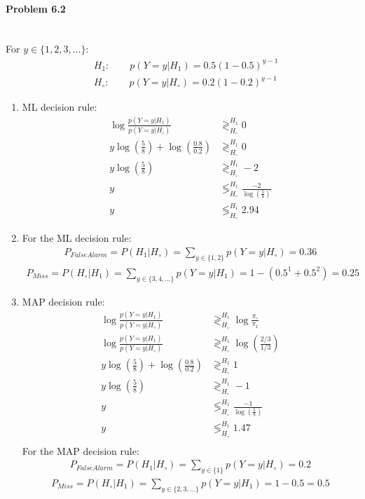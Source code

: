 \documentclass[12pt, letterpaper]{scrartcl}
\begin{document}
\paragraph*{Problem 6.2} \hfill\\
For $y\in\{1,2,3,\dots\}$:
\begin{align*}
    &H_1 : \qquad p(Y=y|H_1)=0.5(1-0.5)^{y-1}\\
    &H_\circ : \qquad p(Y=y|H_\circ)=0.2(1-0.2)^{y-1}
\end{align*}
\begin{enumerate}[((a))]
    \item ML decision rule:
    \begin{align*}
        \log \frac{p(Y=y|H_1)}{p(Y=y|H_\circ)} &\mathop{\gtrless}^{H_1}_{H_\circ}0\\
        y\log(\frac{5}{8})+\log(\frac{0.8}{0.2})&\mathop{\gtrless}^{H_1}_{H_\circ}0\\
        y\log(\frac{5}{8})&\mathop{\gtrless}^{H_1}_{H_\circ} -2\\
        y&\mathop{\lessgtr}^{H_1}_{H_\circ} \frac{-2}{\log(\frac{5}{8})}\\
        y&\mathop{\lessgtr}^{H_1}_{H_\circ} 2.94
    \end{align*}

    \item For the ML decision rule:
    \begin{align*}
        P_{FalseAlarm}=P(H_1|H_\circ)=\sum_{y\in\{1,2\}}p(Y=y|H_\circ)=0.36
    \end{align*}
    \begin{align*}
        P_{Miss}=P(H_\circ|H_1)=\sum_{y\in\{3,4,\dots\}}p(Y=y|H_1)=1-(0.5^1+0.5^2)=0.25
    \end{align*}
    
    \item MAP decision rule:
    \begin{align*}
        \log \frac{p(Y=y|H_1)}{p(Y=y|H_\circ)} &\mathop{\gtrless}^{H_1}_{H_\circ}\log\frac{\pi_\circ}{\pi_1}\\
        \log \frac{p(Y=y|H_1)}{p(Y=y|H_\circ)} &\mathop{\gtrless}^{H_1}_{H_\circ}\log(\frac{2/3}{1/3})\\
        y\log(\frac{5}{8}) + \log(\frac{0.8}{0.2}) &\mathop{\gtrless}^{H_1}_{H_\circ}1\\
        y\log(\frac{5}{8})&\mathop{\gtrless}^{H_1}_{H_\circ} -1\\
        y&\mathop{\lessgtr}^{H_1}_{H_\circ} \frac{-1}{\log(\frac{5}{8})}\\
        y&\mathop{\lessgtr}^{H_1}_{H_\circ} 1.47\\
    \end{align*}
    For the MAP decision rule:
    \begin{align*}
        P_{FalseAlarm}=P(H_1|H_\circ)=\sum_{y\in\{1\}}p(Y=y|H_\circ)=0.2
    \end{align*}
    \begin{align*}
        P_{Miss}=P(H_\circ|H_1)=\sum_{y\in\{2,3,\dots\}}p(Y=y|H_1)=1-0.5=0.5
    \end{align*}
    

\end{enumerate}
\end{document}
